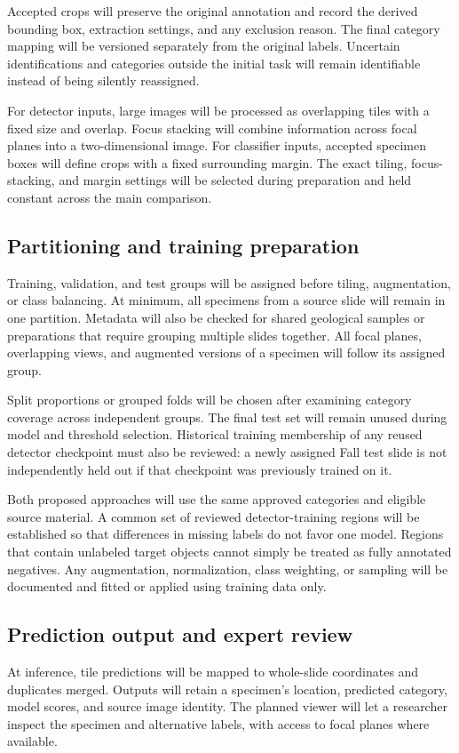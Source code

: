 \documentclass[conference,letterpaper]{IEEEtran}
\begin{document}
Accepted crops will preserve the original annotation and record the derived bounding box, extraction settings, and any exclusion reason. The final category mapping will be versioned separately from the original labels. Uncertain identifications and categories outside the initial task will remain identifiable instead of being silently reassigned.

For detector inputs, large images will be processed as overlapping tiles with a fixed size and overlap. Focus stacking will combine information across focal planes into a two-dimensional image. For classifier inputs, accepted specimen boxes will define crops with a fixed surrounding margin. The exact tiling, focus-stacking, and margin settings will be selected during preparation and held constant across the main comparison.

\subsection{Partitioning and training preparation}
Training, validation, and test groups will be assigned before tiling, augmentation, or class balancing. At minimum, all specimens from a source slide will remain in one partition. Metadata will also be checked for shared geological samples or preparations that require grouping multiple slides together. All focal planes, overlapping views, and augmented versions of a specimen will follow its assigned group.

Split proportions or grouped folds will be chosen after examining category coverage across independent groups. The final test set will remain unused during model and threshold selection. Historical training membership of any reused detector checkpoint must also be reviewed: a newly assigned Fall test slide is not independently held out if that checkpoint was previously trained on it.

Both proposed approaches will use the same approved categories and eligible source material. A common set of reviewed detector-training regions will be established so that differences in missing labels do not favor one model. Regions that contain unlabeled target objects cannot simply be treated as fully annotated negatives. Any augmentation, normalization, class weighting, or sampling will be documented and fitted or applied using training data only.

\subsection{Prediction output and expert review}
At inference, tile predictions will be mapped to whole-slide coordinates and duplicates merged. Outputs will retain a specimen's location, predicted category, model scores, and source image identity. The planned viewer will let a researcher inspect the specimen and alternative labels, with access to focal planes where available.
\end{document}
